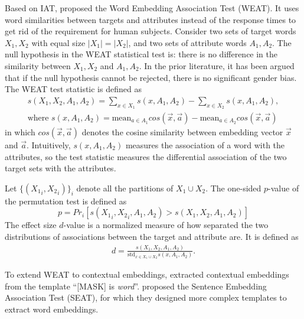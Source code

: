 Based on IAT,  proposed the
Word Embedding Association Test (WEAT). It uses word
similarities between targets and attributes instead of the
response times to get rid of the requirement for human
subjects. Consider two sets of target words $X_1,X_2$ with
equal size $|X_1|=|X_2|$, and two sets of attribute words
$A_1,A_2$. The null hypothesis in the WEAT statistical test
is: there is no difference in the similarity between
$X_1,X_2$ and $A_1,A_2$. In the prior literature, it has
been argued that if the null hypothesis cannot be rejected,
there is no significant gender bias.  The WEAT test
statistic is defined as
\begin{gather*}
s(X_1,X_2,A_1,A_2)=\sum_{x\in X_1}s(x,A_1,A_2)-\sum_{x\in X_2}s(x,A_1,A_2),\\
\mbox{where } s(x,A_1,A_2)=\mbox{mean}_{a\in A_1}cos(\vec{x},\vec{a})-\mbox{mean}_{a\in A_2}cos(\vec{x},\vec{a})
\end{gather*}
in which $cos(\vec{x},\vec{a})$ denotes the cosine similarity between embedding vector $\vec{x}$ and $\vec{a}$. Intuitively, $s(x,A_1,A_2)$ measures the association of a word with the attributes, so the test statistic measures the differential association of the two target sets with the attributes. 

Let $\{({X_1}_i,{X_2}_i)\}_{i}$ denote all the partitions of $X_1\cup X_2$. The one-sided $p$-value of the permutation test is defined as $$p=Pr_i[s({X_1}_i,{X_2}_i,A_1,A_2)>s(X_1,X_2,A_1,A_2)]$$
The effect size $d$-value is a normalized measure of how separated the two distributions of associations between the target and attribute are. It is defined as
\begin{eqnarray}
d=\frac{s(X_1,X_2,A_1,A_2)}{\mbox{std}_{x\in X_1 \cup X_2}s(x,A_1,A_2)}.\nonumber
\end{eqnarray}

To extend WEAT to contextual embeddings,
 extracted contextual embeddings
from the template ``[MASK] is \textit{word}''.
 proposed the Sentence Embedding
Association Test (SEAT), for which they designed more complex templates to extract word embeddings. 

